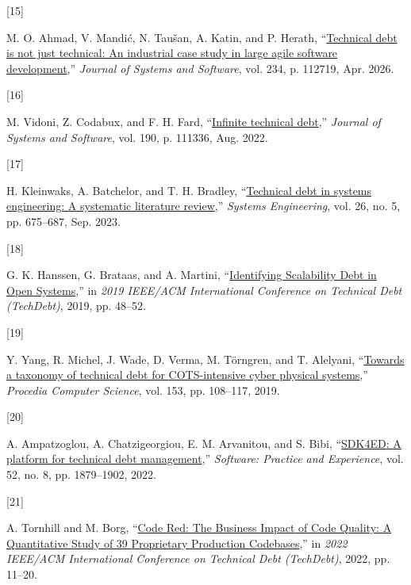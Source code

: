\documentclass[
  journal,
]{IEEEtran}%
\newlength{\cslhangindent}
\newlength{\csllabelwidth}
\newenvironment{CSLReferences}[2] %
 {\begin{list}{}{%
  \setlength{\itemindent}{0pt}
  \setlength{\leftmargin}{0pt}
  \setlength{\parsep}{0pt}
  \ifodd #1
   \setlength{\leftmargin}{\cslhangindent}
   \setlength{\itemindent}{-1\cslhangindent}
  \fi
  \setlength{\itemsep}{#2\baselineskip}}}
 {\end{list}}
\newcommand{\CSLLeftMargin}[1]{\parbox[t]{\csllabelwidth}{\strut#1\strut}}
\newcommand{\CSLRightInline}[1]{\parbox[t]{\linewidth - \csllabelwidth}{\strut#1\strut}}
\begin{document}
\begin{CSLReferences}{0}{0}
\CSLLeftMargin{{[}15{]} }%
\CSLRightInline{M. O. Ahmad, V. Mandić, N. Taušan, A. Katin, and P.
Herath, {``\href{https://doi.org/10.1016/j.jss.2025.112719}{Technical
debt is not just technical: {An} industrial case study in large agile
software development},''} \emph{Journal of Systems and Software}, vol.
234, p. 112719, Apr. 2026. }

\CSLLeftMargin{{[}16{]} }%
\CSLRightInline{M. Vidoni, Z. Codabux, and F. H. Fard,
{``\href{https://doi.org/10.1016/j.jss.2022.111336}{Infinite technical
debt},''} \emph{Journal of Systems and Software}, vol. 190, p. 111336,
Aug. 2022. }

\CSLLeftMargin{{[}17{]} }%
\CSLRightInline{H. Kleinwaks, A. Batchelor, and T. H. Bradley,
{``\href{https://doi.org/10.1002/sys.21681}{Technical debt in systems
engineering: {A} systematic literature review},''} \emph{Systems
Engineering}, vol. 26, no. 5, pp. 675--687, Sep. 2023. }

\CSLLeftMargin{{[}18{]} }%
\CSLRightInline{G. K. Hanssen, G. Brataas, and A. Martini,
{``\href{https://doi.org/10.1109/TechDebt.2019.00014}{Identifying
{Scalability Debt} in {Open Systems}},''} in \emph{2019 {IEEE}/{ACM
International Conference} on {Technical Debt} ({TechDebt})}, 2019, pp.
48--52. }

\CSLLeftMargin{{[}19{]} }%
\CSLRightInline{Y. Yang, R. Michel, J. Wade, D. Verma, M. Törngren, and
T. Alelyani,
{``\href{https://doi.org/10.1016/j.procs.2019.05.061}{Towards a taxonomy
of technical debt for {COTS-intensive} cyber physical systems},''}
\emph{Procedia Computer Science}, vol. 153, pp. 108--117, 2019. }

\CSLLeftMargin{{[}20{]} }%
\CSLRightInline{A. Ampatzoglou, A. Chatzigeorgiou, E. M. Arvanitou, and
S. Bibi, {``\href{https://doi.org/10.1002/spe.3093}{{SDK4ED}: {A}
platform for technical debt management},''} \emph{Software: Practice and
Experience}, vol. 52, no. 8, pp. 1879--1902, 2022. }

\CSLLeftMargin{{[}21{]} }%
\CSLRightInline{A. Tornhill and M. Borg,
{``\href{https://doi.org/10.1145/3524843.3528091}{Code {Red}: {The
Business Impact} of {Code Quality}: {A Quantitative Study} of 39
{Proprietary Production Codebases}},''} in \emph{2022 {IEEE}/{ACM
International Conference} on {Technical Debt} ({TechDebt})}, 2022, pp.
11--20. }


\end{CSLReferences}
\end{document}
